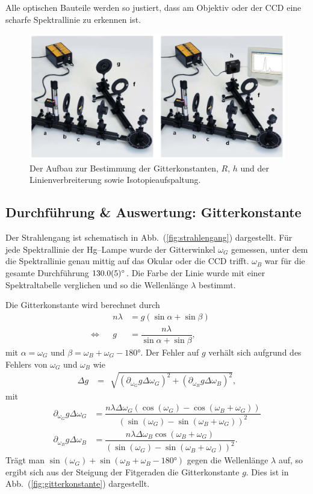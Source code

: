 \documentclass[sn-mathphys-num,iicol]{sn-jnl}
\theoremstyle{thmstyleone}
\theoremstyle{thmstyletwo}
\theoremstyle{thmstylethree}
\begin{document}
Alle optischen Bauteile werden so justiert, dass am Objektiv oder der CCD eine scharfe Spektrallinie zu erkennen ist.
\begin{figure}[t]
        \centering
        \includegraphics[width=.5\textwidth]{402_aufbau_spektrallinie.png}
        \caption{Der Aufbau zur Bestimmung der Gitterkonstanten, $R$, $h$ und der Linienverbreiterung sowie Isotopieaufspaltung.\cite{Anleitung402}} \label{fig:aufbau_spektrallinie}
\end{figure}

\subsection{Durchführung \& Auswertung: Gitterkonstante}
Der Strahlengang ist schematisch in Abb.\ (\ref{fig:strahlengang}) dargestellt.
Für jede Spektrallinie der Hg--Lampe wurde der Gitterwinkel $\omega _G$ gemessen, unter dem die Spektrallinie genau mittig auf das Okular oder die CCD trifft.
$\omega _B$ war für die gesamte Durchführung $\ang{130+-.5}$.
Die Farbe der Linie wurde mit einer Spektraltabelle \cite{Anleitung402} verglichen und so die Wellenlänge $\lambda $ bestimmt.

Die Gitterkonstante wird berechnet durch
\begin{align} 
        &&n\lambda &=g\left(\sin \alpha +\sin \beta \right)&&\\
        \Leftrightarrow &&g&=\dfrac{n\lambda }{\sin \alpha +\sin \beta },&&
\end{align} 
mit $\alpha =\omega _G$ und $\beta =\omega _B+\omega _G-\ang{180}$.
Der Fehler auf $g$ verhält sich aufgrund des Fehlers von $\omega _G$ und $\omega _B$ wie
\begin{align} 
        \Delta g &= \,\sqrt[]{\left(\partial _{\omega _G}g\Delta \omega _G\right)^2+\left(\partial _{\omega _B}g\Delta \omega _B\right)^2}
,\end{align} 
mit
\begin{align} 
        \partial _{\omega _G}g\Delta \omega _G &= \dfrac{n\lambda \Delta \omega _G\left(\cos \left(\omega _G\right)-\cos \left(\omega _B+\omega _G\right)\right)}{\left(\sin \left(\omega _G\right)-\sin \left(\omega _B+\omega _G\right)\right)^2}\\
        \partial _{\omega _B}g\Delta \omega _B &= \dfrac{n\lambda \Delta \omega _B\cos \left(\omega _B+\omega _G\right)}{\left(\sin \left(\omega _G\right)-\sin \left(\omega _B+\omega _G\right)\right)^2}
.\end{align} 
Trägt man $\sin \left(\omega _G\right)+\sin \left(\omega _B+\omega _B-\ang{180}\right)$ gegen die Wellenlänge $\lambda $ auf, so ergibt sich aus der Steigung der Fitgeraden die Gitterkonstante $g$.
Dies ist in Abb.\ (\ref{fig:gitterkonstante}) dargestellt.
\end{document}
